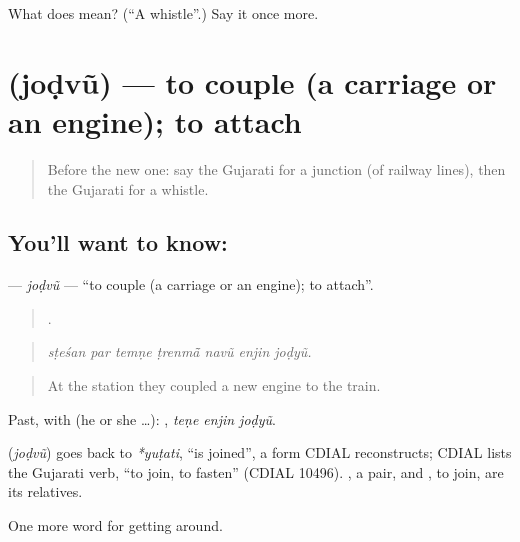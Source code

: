 \begin{tcolorbox}[breakable,colback=teal!4,colframe=teal!35!black,title={Before you move on}]
What does  mean? (\textquotedblleft{}A whistle\textquotedblright{}.) Say it once more.
\end{tcolorbox}
\section[\texorpdfstring{\gu{જોડવું} (joḍvũ)}{જોડવું (joḍvũ)}]{ (joḍvũ) — to couple (a carriage or an engine); to attach}

\label{lesson:GU-C393-jodvu}



\begin{quote}
Before the new one: say the Gujarati for a junction (of railway lines), then the Gujarati for a whistle.
\end{quote}

\subsection*{You'll want to know: }
\textbf{} — \emph{joḍvũ} — \textquotedblleft{}to couple (a carriage or an engine); to attach\textquotedblright{}.

\begin{quote}
      .
\end{quote}

\begin{quote}
\emph{sṭeśan par temṇe ṭrenmā̃ navũ enjin joḍyũ.}
\end{quote}

\begin{quote}
At the station they coupled a new engine to the train.
\end{quote}

Past, with  (he or she …):   , \emph{teṇe enjin joḍyũ}.

\begin{cousinweb}
\textbf{} (\emph{joḍvũ}) goes back to \emph{*yuṭati}, \textquotedblleft{}is joined\textquotedblright{}, a form CDIAL reconstructs; CDIAL lists the Gujarati verb, \textquotedblleft{}to join, to fasten\textquotedblright{} (CDIAL 10496). , a pair, and , to join, are its relatives.
\end{cousinweb}

\begin{grammarlens}[title={What you've built}]
One more word for getting around.
\end{grammarlens}


